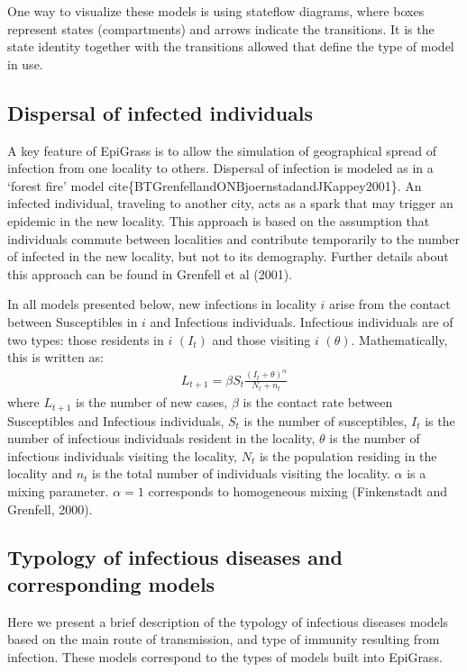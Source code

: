 \documentclass[letterpaper,10pt,english]{sphinxmanual}
\begin{document}
One way to visualize these models is using state\sphinxhyphen{}flow diagrams, where boxes represent states (compartments) and arrows indicate the transitions. It is the state identity together with the transitions allowed that define the type of model in use.


\subsection{Dispersal of infected individuals}
\label{\detokenize{intromodels:dispersal-of-infected-individuals}}
A key feature of EpiGrass is to allow the simulation of geographical spread of infection from one locality to others. Dispersal of infection is modeled as in a ‘forest fire’ model cite\{BTGrenfellandONBjoernstadandJKappey2001\}. An infected individual, traveling to another city, acts as a spark that may trigger an epidemic in the new locality. This approach is based on the assumption that individuals commute between localities and contribute temporarily to the number of infected in the new locality, but not to its demography. Further details about this approach can be found in Grenfell et al (2001).

In all models presented below, new infections in locality \(i\) arise from the contact between Susceptibles in \(i\) and Infectious individuals. Infectious individuals are of two types: those residents in \(i\) \((I_t)\) and those visiting \(i\) \((\theta)\). Mathematically, this is written as:
\begin{equation*}
\begin{split}L_{t+1} = \beta S_t \frac{(I_t+\theta)^\alpha} {N_t+n_t}\end{split}
\end{equation*}
where \(L_{t+1}\) is the number of new cases, \(\beta\) is the contact rate between Susceptibles and Infectious individuals, \(S_t\) is the number of susceptibles, \(I_t\) is the number of infectious individuals resident in the locality, \(\theta\) is the number of infectious individuals visiting the locality, \(N_t\) is the population residing in the locality and \(n_t\) is the total number of individuals visiting the locality. \(\alpha\) is a mixing parameter. \(\alpha=1\) corresponds to homogeneous mixing (Finkenstadt and Grenfell, 2000).


\subsection{Typology of infectious diseases and corresponding models}
\label{\detokenize{intromodels:typology-of-infectious-diseases-and-corresponding-models}}
\ignorespaces 
Here we present a brief description of the typology of infectious
diseases models based on the main route of transmission, and type of
immunity resulting from infection. These models correspond to the
types of models built into EpiGrass.
\end{document}
